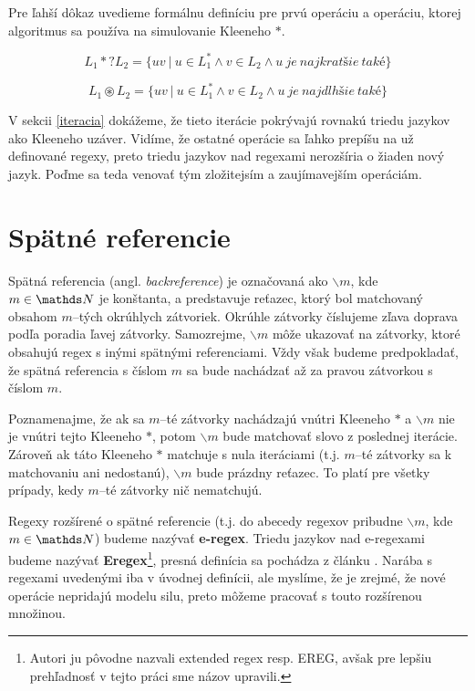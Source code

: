 Pre ľahší dôkaz uvedieme formálnu definíciu pre prvú operáciu a operáciu, ktorej algoritmus sa používa na simulovanie Kleeneho $*$.

\begin{df}
$$ L_{1} *? L_{2} = \lbrace uv ~|~ u \in L_1^* \land v \in L_2 \land u~je~najkratšie~také \rbrace $$
\end{df}

\begin{df}
$$ L_{1} \circledast L_{2} = \lbrace uv ~|~ u \in L_1^* \land v \in L_2 \land u~je~najdlhšie~také \rbrace$$
\end{df}

V sekcii \ref{iteracia} dokážeme, že tieto iterácie pokrývajú rovnakú triedu jazykov ako Kleeneho uzáver. Vidíme, že ostatné operácie sa ľahko prepíšu na už definované regexy, preto triedu jazykov nad regexami nerozšíria o žiaden nový jazyk. Poďme sa teda venovať tým zložitejsím a zaujímavejším operáciám.

\section{Spätné referencie}\label{chap:backref1}

Spätná referencia (angl. \textit{backreference}) je označovaná ako $ \backslash m $, kde $m \in \N$ je kon\-štan\-ta, a predstavuje reťazec, ktorý bol matchovaný obsahom $m$--tých okrúhlych zátvoriek. Okrúhle zátvorky číslujeme zľava doprava podľa poradia ľavej zátvorky. Samozrejme, $\backslash m$ môže ukazovať na zátvorky, ktoré obsahujú regex s inými spätnými referenciami. Vždy však budeme predpokladať, že spätná referencia s číslom $m$ sa bude nachádzať až za pravou zátvorkou s číslom $m$.

Poznamenajme, že ak sa $m$--té zátvorky nachádzajú vnútri Kleeneho $*$ a $\backslash m$ nie je vnútri tejto Kleeneho $*$, potom $\backslash m$ bude matchovať slovo z poslednej iterácie. Zároveň ak táto Kleeneho $*$ matchuje s nula iteráciami (t.j. $m$--té zátvorky sa k matchovaniu ani nedostanú), $\backslash m$ bude prázdny reťazec. To platí pre všetky prípady, kedy $m$--té zátvorky nič nematchujú.

Regexy rozšírené o spätné referencie (t.j. do abecedy regexov pribudne $\backslash m$, kde $m \in \N$) budeme nazývať \textbf{e-regex}. Triedu jazykov nad e-regexami budeme nazývať \textbf{Eregex}\footnote{Autori ju pôvodne nazvali extended regex resp. EREG, avšak pre lepšiu prehľadnosť v tejto práci sme názov upravili.}, presná definícia sa pochádza z článku \cite{ExtendedRegexPower}.  Narába s regexami uvedenými iba v úvodnej definícii, ale myslíme, že je zrejmé, že nové operácie nepridajú modelu silu, preto môžeme pracovať s touto rozšírenou množinou.


